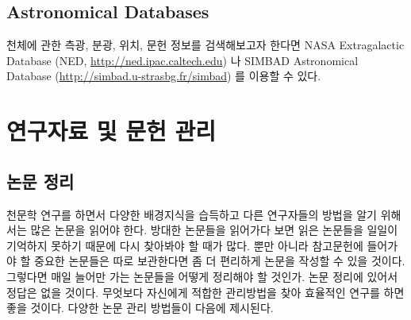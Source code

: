 \subsection{Astronomical Databases} 
천체에 관한 측광, 분광, 위치, 문헌 정보를 검색해보고자 한다면 NASA Extragalactic
Database (NED, \url{http://ned.ipac.caltech.edu}) 나 SIMBAD Astronomical
Database (\url{http://simbad.u-strasbg.fr/simbad}) 를 이용할 수 있다.

\section{연구자료 및 문헌 관리}
\subsection{논문 정리}
천문학 연구를 하면서 다양한 배경지식을 습득하고 다른 연구자들의 방법을 알기
위해서는 많은 논문을 읽어야 한다. 방대한 논문들을 읽어가다 보면 읽은 논문들을
일일이 기억하지 못하기 때문에 다시 찾아봐야 할 때가 많다. 뿐만 아니라 참고문헌에
들어가야 할 중요한 논문들은 따로 보관한다면 좀 더 편리하게 논문을 작성할 수 있을
것이다. 그렇다면 매일 늘어만 가는 논문들을 어떻게 정리해야 할 것인가. 논문 정리에
있어서 정답은 없을 것이다. 무엇보다 자신에게 적합한 관리방법을 찾아 효율적인
연구를 하면 좋을 것이다. 다양한 논문 관리 방법들이 다음에 제시된다.

